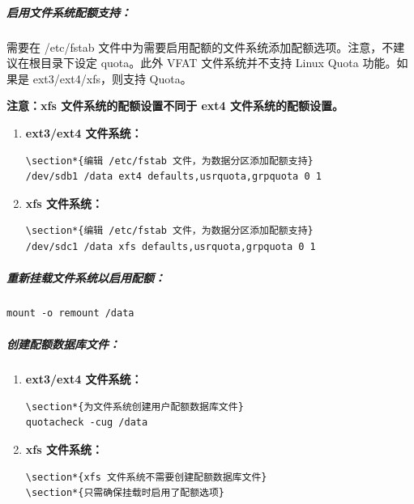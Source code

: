 \documentclass[12pt,UTF8]{ctexbook}
\begin{document}
\subparagraph{启用文件系统配额支持：}
需要在 /etc/fstab 文件中为需要启用配额的文件系统添加配额选项。注意，不建议在根目录下设定 quota。此外 VFAT 文件系统并不支持 Linux Quota 功能。如果是 ext3/ext4/xfs，则支持 Quota。

\textbf{注意：xfs 文件系统的配额设置不同于 ext4 文件系统的配额设置。}

\begin{enumerate}
    \item \textbf{ext3/ext4 文件系统：}
    \begin{verbatim}
\section*{编辑 /etc/fstab 文件，为数据分区添加配额支持}
/dev/sdb1 /data ext4 defaults,usrquota,grpquota 0 1
    \end{verbatim}
    
    \item \textbf{xfs 文件系统：}
    \begin{verbatim}
\section*{编辑 /etc/fstab 文件，为数据分区添加配额支持}
/dev/sdc1 /data xfs defaults,usrquota,grpquota 0 1
    \end{verbatim}
\end{enumerate}

\subparagraph{重新挂载文件系统以启用配额：}
\begin{verbatim}
mount -o remount /data
\end{verbatim}

\subparagraph{创建配额数据库文件：}
\begin{enumerate}
    \item \textbf{ext3/ext4 文件系统：}
    \begin{verbatim}
\section*{为文件系统创建用户配额数据库文件}
quotacheck -cug /data
    \end{verbatim}
    
    \item \textbf{xfs 文件系统：}
    \begin{verbatim}
\section*{xfs 文件系统不需要创建配额数据库文件}
\section*{只需确保挂载时启用了配额选项}
    \end{verbatim}
\end{enumerate}
\end{document}
